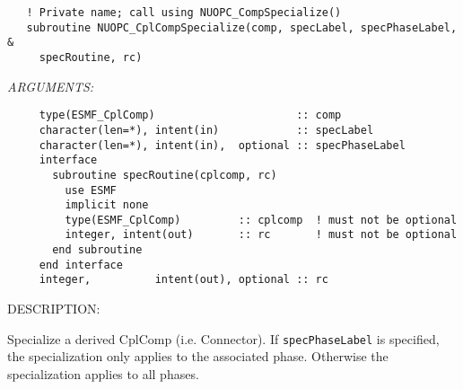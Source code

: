   
\begin{verbatim}   ! Private name; call using NUOPC_CompSpecialize()
   subroutine NUOPC_CplCompSpecialize(comp, specLabel, specPhaseLabel, &
     specRoutine, rc)\end{verbatim}{\em ARGUMENTS:}
\begin{verbatim}     type(ESMF_CplComp)                      :: comp
     character(len=*), intent(in)            :: specLabel
     character(len=*), intent(in),  optional :: specPhaseLabel
     interface
       subroutine specRoutine(cplcomp, rc)
         use ESMF
         implicit none
         type(ESMF_CplComp)         :: cplcomp  ! must not be optional
         integer, intent(out)       :: rc       ! must not be optional
       end subroutine
     end interface
     integer,          intent(out), optional :: rc \end{verbatim}
{\sf DESCRIPTION:\\ }


   Specialize a derived CplComp (i.e. Connector). If
   {\tt specPhaseLabel} is specified, the specialization only applies to
   the associated phase. Otherwise the specialization applies to all phases.
\setlength{\parskip}{\oldparskip}
\setlength{\parindent}{\oldparindent}
\setlength{\baselineskip}{\oldbaselineskip}

